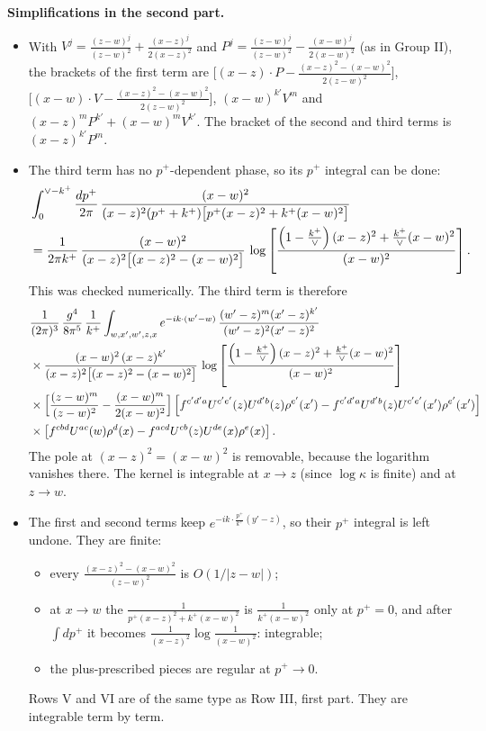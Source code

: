 \documentclass[9pt]{article}
\numberwithin{equation}{section}
\begin{document}
{\color{red}\textbf{Simplifications in the second part.}
\begin{itemize}
\item With $V^{j}=\frac{(z-w)^{j}}{(z-w)^{2}}+\frac{(x-z)^{j}}{2(x-z)^{2}}$ and $P^{j}=\frac{(z-w)^{j}}{(z-w)^{2}}-\frac{(x-w)^{j}}{2(x-w)^{2}}$ (as in Group II), the brackets of the first term are
$\big[(x-z)\cdot P-\frac{(x-z)^{2}-(x-w)^{2}}{2(z-w)^{2}}\big]$, $\big[(x-w)\cdot V-\frac{(x-z)^{2}-(x-w)^{2}}{2(z-w)^{2}}\big]$, $(x-w)^{k'}V^{m}$ and $(x-z)^{m}P^{k'}+(x-w)^{m}V^{k'}$. The bracket of the second and third terms is $(x-z)^{k'}P^{m}$.
\item The third term has no $p^{+}$-dependent phase, so its $p^{+}$ integral can be done:
\begin{align}
&\int_{0}^{\vee-k^{+}}\frac{dp^{+}}{2\pi}\,\frac{(x-w)^{2}}{(x-z)^{2}(p^{+}+k^{+})\big[p^{+}(x-z)^{2}+k^{+}(x-w)^{2}\big]}\notag\\
&=\frac{1}{2\pi k^{+}}\,\frac{(x-w)^{2}}{(x-z)^{2}\big[(x-z)^{2}-(x-w)^{2}\big]}\,\log\left[\frac{\left(1-\frac{k^{+}}{\vee}\right)(x-z)^{2}+\frac{k^{+}}{\vee}(x-w)^{2}}{(x-w)^{2}}\right].
\end{align}
This was checked numerically. The third term is therefore
\begin{align}
&\frac{1}{(2\pi)^{3}}\,\frac{g^{4}}{8\pi^{5}}\,\frac{1}{k^{+}}\int_{w,x',w',z,x}e^{-ik\cdot(w'-w)}\,\frac{(w'-z)^{m}(x'-z)^{k'}}{(w'-z)^{2}(x'-z)^{2}}\notag\\
&\times\frac{(x-w)^{2}\,(x-z)^{k'}}{(x-z)^{2}\big[(x-z)^{2}-(x-w)^{2}\big]}\,\log\left[\frac{\left(1-\frac{k^{+}}{\vee}\right)(x-z)^{2}+\frac{k^{+}}{\vee}(x-w)^{2}}{(x-w)^{2}}\right]\notag\\
&\times\Big[\frac{(z-w)^{m}}{(z-w)^{2}}-\frac{(x-w)^{m}}{2(x-w)^{2}}\Big]
\left[f^{c'd'a}U^{c'e'}(z)U^{d'b}(z)\rho^{e'}(x')-f^{c'd'a}U^{d'b}(z)U^{c'e'}(x')\rho^{e'}(x')\right]\notag\\
&\times\left[f^{cbd}U^{ac}(w)\rho^{d}(x)-f^{acd}U^{cb}(z)U^{de}(x)\rho^{e}(x)\right].\notag
\end{align}
The pole at $(x-z)^{2}=(x-w)^{2}$ is removable, because the logarithm vanishes there. The kernel is integrable at $x\to z$ (since $\log\kappa$ is finite) and at $z\to w$.
\item The first and second terms keep $e^{-ik\cdot\frac{p^{+}}{k^{+}}(y'-z)}$, so their $p^{+}$ integral is left undone. They are finite:
\begin{itemize}
\item every $\frac{(x-z)^{2}-(x-w)^{2}}{(z-w)^{2}}$ is $O(1/|z-w|)$;
\item at $x\to w$ the $\frac{1}{p^{+}(x-z)^{2}+k^{+}(x-w)^{2}}$ is $\frac{1}{k^{+}(x-w)^{2}}$ only at $p^{+}=0$, and after $\int dp^{+}$ it becomes $\frac{1}{(x-z)^{2}}\log\frac{1}{(x-w)^{2}}$: integrable;
\item the plus-prescribed pieces are regular at $p^{+}\to0$.
\end{itemize}
Rows V and VI are of the same type as Row III, first part. They are integrable term by term.
\end{itemize}}
\end{document}
